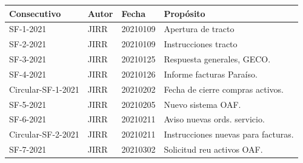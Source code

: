 \documentclass[12pt]{article}
\begin{document}
    

\begin{table}[]
\centering
\begin{tabular}{@{}llll@{}}
\toprule
Consecutivo & Autor & Fecha & Propósito \\ 
\midrule
      SF-1-2021      &JIRR     &20210109       &Apertura de tracto \\
      SF-2-2021      &JIRR     &20210109       &Instrucciones tracto \\ 
      SF-3-2021      &JIRR     &20210125       &Respuesta generales, GECO. \\ 
      SF-4-2021      &JIRR     &20210126       &Informe facturas Paraíso. \\ 
      Circular-SF-1-2021      &JIRR     &20210202       &Fecha de cierre compras activos. \\ 
      SF-5-2021      &JIRR     &20210205 &Nuevo sistema OAF. \\ 
      SF-6-2021      &JIRR     &20210211 &Aviso nuevas ords. servicio. \\ 
      Circular-SF-2-2021      &JIRR     &20210211       &Instrucciones nuevas para facturas. \\ SF-7-2021      &JIRR     &20210302 &Solicitud reu activos OAF. \\ 
      \bottomrule
\end{tabular}
\end{table}
\end{document}
